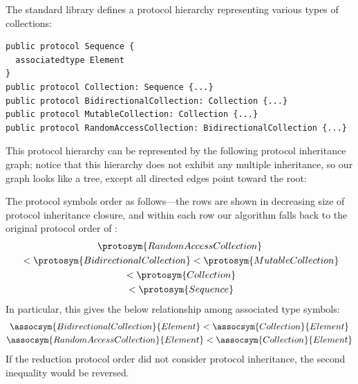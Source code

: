 \documentclass[../generics]{subfiles}
\begin{document}
\begin{example}
The standard library defines a protocol hierarchy representing various types of collections:
\begin{Verbatim}
public protocol Sequence {
  associatedtype Element
}
public protocol Collection: Sequence {...}
public protocol BidirectionalCollection: Collection {...}
public protocol MutableCollection: Collection {...}
public protocol RandomAccessCollection: BidirectionalCollection {...}
\end{Verbatim}
This protocol hierarchy can be represented by the following protocol inheritance graph; notice that this hierarchy does not exhibit any multiple inheritance, so our graph looks like a tree, except all directed edges point toward the root:
\begin{quote}
\end{quote}
The protocol symbols order as follows---the rows are shown in decreasing size of protocol inheritance closure, and within each row our algorithm falls back to the original protocol order of :
\begin{gather*}
\protosym{RandomAccessCollection}\\
{} < \protosym{BidirectionalCollection}<\protosym{MutableCollection}\\
{} < \protosym{Collection}\\
{} < \protosym{Sequence}
\end{gather*}
In particular, this gives the below relationship among associated type symbols:
\begin{gather*}
\assocsym{BidirectionalCollection}{Element} < \assocsym{Collection}{Element}\\
\assocsym{RandomAccessCollection}{Element} < \assocsym{Collection}{Element}
\end{gather*}
If the reduction protocol order did not consider protocol inheritance, the second inequality would be reversed.
\end{example}
\end{document}
